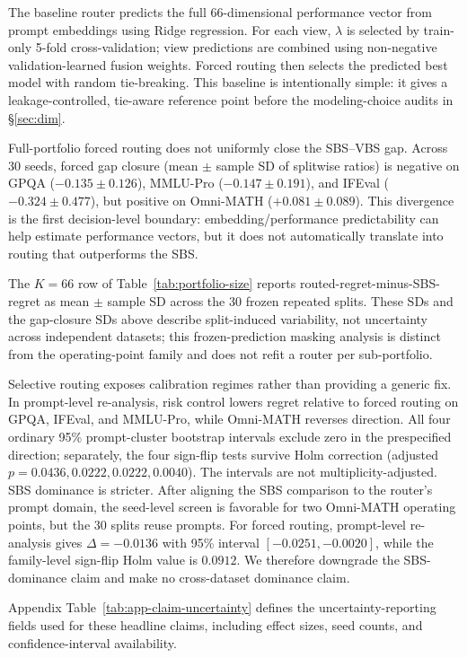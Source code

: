 \documentclass{article}
\begin{document}
The baseline router predicts the full 66-dimensional performance vector from prompt embeddings using Ridge regression. For each view, $\lambda$ is selected by train-only 5-fold cross-validation; view predictions are combined using non-negative validation-learned fusion weights. Forced routing then selects the predicted best model with random tie-breaking. This baseline is intentionally simple: it gives a leakage-controlled, tie-aware reference point before the modeling-choice audits in \S\ref{sec:dim}.

Full-portfolio forced routing does not uniformly close the SBS--VBS gap. Across 30 seeds, forced gap closure (mean $\pm$ sample SD of splitwise ratios) is negative on GPQA ($-0.135\pm0.126$), MMLU-Pro ($-0.147\pm0.191$), and IFEval ($-0.324\pm0.477$), but positive on Omni-MATH ($+0.081\pm0.089$). This divergence is the first decision-level boundary: embedding/performance predictability can help estimate performance vectors, but it does not automatically translate into routing that outperforms the SBS.

The $K=66$ row of Table~\ref{tab:portfolio-size} reports routed-regret-minus-SBS-regret as mean $\pm$ sample SD across the 30 frozen repeated splits. These SDs and the gap-closure SDs above describe split-induced variability, not uncertainty across independent datasets; this frozen-prediction masking analysis is distinct from the operating-point family and does not refit a router per sub-portfolio.

Selective routing exposes calibration regimes rather than providing a generic fix. In prompt-level re-analysis, risk control lowers regret relative to forced routing on GPQA, IFEval, and MMLU-Pro, while Omni-MATH reverses direction. All four ordinary 95\% prompt-cluster bootstrap intervals exclude zero in the prespecified direction; separately, the four sign-flip tests survive Holm correction (adjusted $p=0.0436,0.0222,0.0222,0.0040$). The intervals are not multiplicity-adjusted. SBS dominance is stricter. After aligning the SBS comparison to the router's prompt domain, the seed-level screen is favorable for two Omni-MATH operating points, but the 30 splits reuse prompts. For forced routing, prompt-level re-analysis gives $\Delta=-0.0136$ with 95\% interval $[-0.0251,-0.0020]$, while the family-level sign-flip Holm value is $0.0912$. We therefore downgrade the SBS-dominance claim and make no cross-dataset dominance claim.

Appendix Table~\ref{tab:app-claim-uncertainty} defines the uncertainty-reporting fields used for these headline claims, including effect sizes, seed counts, and confidence-interval availability.
\end{document}
